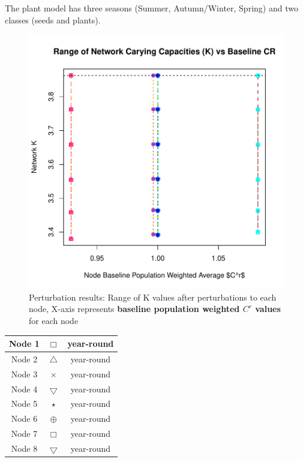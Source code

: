 \documentclass[10pt]{article}
\begin{document}
The plant model has three seasons (Summer, Autumn/Winter, Spring) and two classes (seeds and plants).


\vspace{-.5cm}
\begin{figure}[H]
\begin{center}
\includegraphics[width=.8\textwidth, height=.8\textwidth]{RGraphics-plant_barcr_averageCR}
\caption{Perturbation results: Range of K values after perturbations to each node, X-axis represents {\bf{baseline population weighted $C^r$ values}} for each node}\label{fig:plant_barcr_averageCR}
\end{center}
\end{figure}

\vspace{-.5cm}
\begin{tabular}{|c|c|c|}
\hline
{\color{red} Node 1} & $\Box$ & year-round \\
\hline
{\color{orange} Node 2} & $\triangle$ & year-round \\
\hline
{\color{yellow} Node 3} & $\times$ &  year-round \\
\hline
{\color{green} Node 4} & $\bigtriangledown$ & year-round \\
\hline
{\color{blue} Node 5} & $\star$ & year-round \\
\hline
{\color{purple} Node 6} & $\oplus$ & year-round \\
\hline
{\color{magenta} Node 7} & $\Box$ & year-round \\
\hline
{\color{cyan} Node 8} & $\bigtriangledown$ & year-round \\
\hline
\end{tabular}
\end{document}
